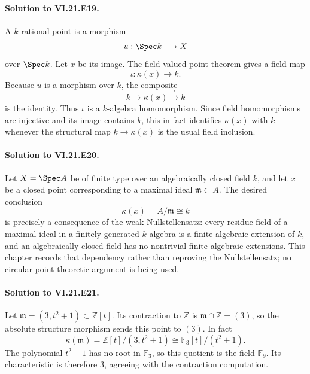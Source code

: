 \paragraph{Solution to VI.21.E19.}
\begin{solution}
A $k$-rational point is a morphism
\[
u:\Spec k\longrightarrow X
\]
over $\Spec k$.  Let $x$ be its image.  The field-valued point theorem gives a field map
\[
\iota:\kappa(x)\longrightarrow k.
\]
Because $u$ is a morphism over $k$, the composite
\[
k\longrightarrow\kappa(x)\xrightarrow{\iota}k
\]
is the identity.  Thus $\iota$ is a $k$-algebra homomorphism.  Since field homomorphisms are
injective and its image contains $k$, this in fact identifies $\kappa(x)$ with $k$ whenever the
structural map $k\to\kappa(x)$ is the usual field inclusion.
\end{solution}

\paragraph{Solution to VI.21.E20.}
\begin{solution}
Let $X=\Spec A$ be of finite type over an algebraically closed field $k$, and let $x$ be a
closed point corresponding to a maximal ideal $\mathfrak m\subset A$.  The desired conclusion
\[
\kappa(x)=A/\mathfrak m\cong k
\]
is precisely a consequence of the weak Nullstellensatz: every residue field of a maximal ideal in
a finitely generated $k$-algebra is a finite algebraic extension of $k$, and an algebraically closed
field has no nontrivial finite algebraic extensions.  This chapter records that dependency rather
than reproving the Nullstellensatz; no circular point-theoretic argument is being used.
\end{solution}

\paragraph{Solution to VI.21.E21.}
\begin{solution}
Let $\mathfrak m=(3,t^2+1)\subset\mathbb Z[t]$.  Its contraction to $\mathbb Z$ is
$\mathfrak m\cap\mathbb Z=(3)$, so the absolute structure morphism sends this point to $(3)$.  In
fact
\[
\kappa(\mathfrak m)=\mathbb Z[t]/(3,t^2+1)
\cong\mathbb F_3[t]/(t^2+1).
\]
The polynomial $t^2+1$ has no root in $\mathbb F_3$, so this quotient is the field $\mathbb F_9$.
Its characteristic is therefore $3$, agreeing with the contraction computation.
\end{solution}

